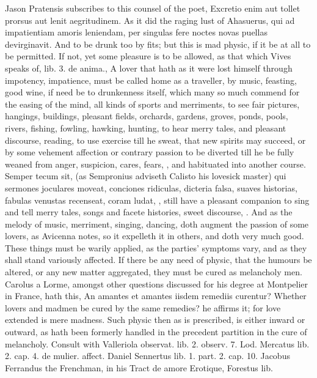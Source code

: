 {Jason Pratensis subscribes to this counsel of the poet, Excretio
enim aut tollet prorsus aut lenit aegritudinem. As it did the raging
lust of Ahasuerus, qui ad impatientiam amoris leniendam, per
singulas fere noctes novas puellas devirginavit. And to be drunk too by
fits; but this is mad physic, if it be at all to be permitted. If not,
yet some pleasure is to be allowed, as that which Vives speaks of, lib.
3. de anima., A lover that hath as it were lost himself through
impotency, impatience, must be called home as a traveller, by music,
feasting, good wine, if need be to drunkenness itself, which many so
much commend for the easing of the mind, all kinds of sports and
merriments, to see fair pictures, hangings, buildings, pleasant fields,
orchards, gardens, groves, ponds, pools, rivers, fishing, fowling,
hawking, hunting, to hear merry tales, and pleasant discourse, reading,
to use exercise till he sweat, that new spirits may succeed, or by some
vehement affection or contrary passion to be diverted till he be fully
weaned from anger, suspicion, cares, fears, \etc{}, and habituated into
another course. Semper tecum sit, (as Sempronius adviseth Calisto
his lovesick master) qui sermones joculares moveat, conciones
ridiculas, dicteria falsa, suaves historias, fabulas venustas
recenseat, coram ludat, \etc{}, still have a pleasant companion to sing
and tell merry tales, songs and facete histories, sweet discourse, \etc{}.
And as the melody of music, merriment, singing, dancing, doth augment
the passion of some lovers, as  Avicenna notes, so it expelleth
it in others, and doth very much good. These things must be warily
applied, as the parties' symptoms vary, and as they shall stand
variously affected.
If there be any need of physic, that the humours be altered, or any new
matter aggregated, they must be cured as melancholy men. Carolus a
Lorme, amongst other questions discussed for his degree at Montpelier
in France, hath this, An amantes et amantes iisdem remediis curentur?
Whether lovers and madmen be cured by the same remedies? he affirms it;
for love extended is mere madness. Such physic then as is prescribed,
is either inward or outward, as hath been formerly handled in the
precedent partition in the cure of melancholy. Consult with Valleriola
observat. lib. 2. observ. 7. Lod. Mercatus lib. 2. cap. 4. de mulier.
affect. Daniel Sennertus lib. 1. part. 2. cap. 10. Jacobus
Ferrandus the Frenchman, in his \textlatin{Tract de amore Erotique}, Forestus lib.
}
